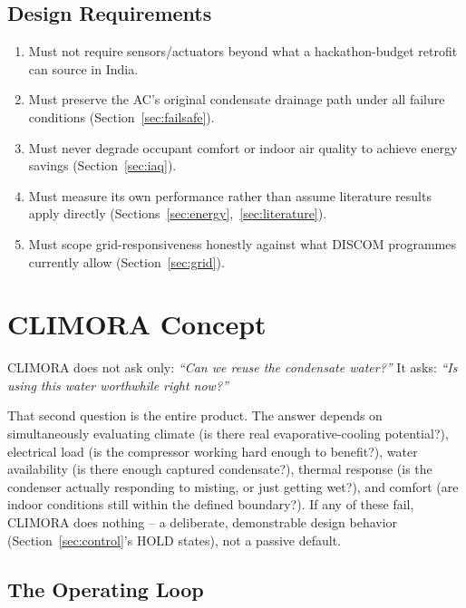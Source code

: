 \documentclass[11pt,a4paper]{article}
\begin{document}
\subsection{Design Requirements}
\begin{enumerate}
    \item Must not require sensors/actuators beyond what a hackathon-budget retrofit can source in India.
    \item Must preserve the AC's original condensate drainage path under all failure conditions (Section~\ref{sec:failsafe}).
    \item Must never degrade occupant comfort or indoor air quality to achieve energy savings (Section~\ref{sec:iaq}).
    \item Must measure its own performance rather than assume literature results apply directly (Sections~\ref{sec:energy},~\ref{sec:literature}).
    \item Must scope grid-responsiveness honestly against what DISCOM programmes currently allow (Section~\ref{sec:grid}).
\end{enumerate}

\section{CLIMORA Concept}
\label{sec:concept}

CLIMORA does not ask only: \emph{``Can we reuse the condensate water?''} It asks: \emph{``Is using this water worthwhile right now?''}

That second question is the entire product. The answer depends on simultaneously evaluating climate (is there real evaporative-cooling potential?), electrical load (is the compressor working hard enough to benefit?), water availability (is there enough captured condensate?), thermal response (is the condenser actually responding to misting, or just getting wet?), and comfort (are indoor conditions still within the defined boundary?). If any of these fail, CLIMORA does nothing -- a deliberate, demonstrable design behavior (Section~\ref{sec:control}'s HOLD states), not a passive default.

\subsection{The Operating Loop}
\end{document}
